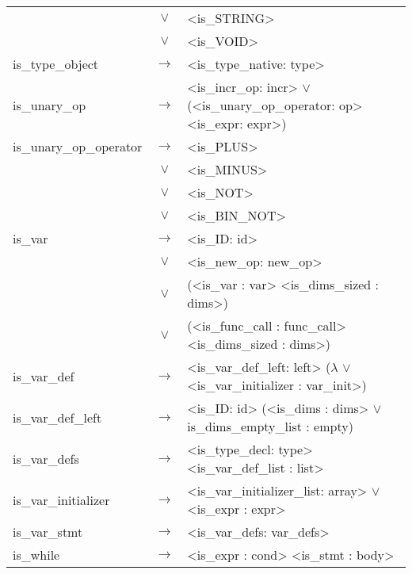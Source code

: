 \documentclass[a4paper]{article}
\begin{document}
\begin{longtable}{lcl}
								& $\vee$ & <is\_STRING> \\
								& $\vee$ & <is\_VOID> \\
	is\_type\_object			& $\to$ & <is\_type\_native: type> \\
	is\_unary\_op				& $\to$ & <is\_incr\_op: incr> $\vee$ (<is\_unary\_op\_operator: op> <is\_expr: expr>) \\
	is\_unary\_op\_operator		& $\to$ & <is\_PLUS> \\
								& $\vee$ & <is\_MINUS> \\
								& $\vee$ & <is\_NOT> \\
								& $\vee$ & <is\_BIN\_NOT> \\
	is\_var					 	& $\to$ & <is\_ID: id> \\
								& $\vee$ & <is\_new\_op: new\_op> \\
								& $\vee$ & (<is\_var : var> <is\_dims\_sized : dims>) \\
								& $\vee$ & (<is\_func\_call : func\_call> <is\_dims\_sized : dims>) \\
	is\_var\_def			 	& $\to$ & <is\_var\_def\_left: left> ($\lambda$ $\vee$ <is\_var\_initializer : var\_init>) \\
	is\_var\_def\_left		 	& $\to$ & <is\_ID: id> (<is\_dims : dims> $\vee$ is\_dims\_empty\_list : empty) \\
	is\_var\_defs		 		& $\to$ & <is\_type\_decl: type> <is\_var\_def\_list : list> \\
	is\_var\_initializer 		& $\to$ & <is\_var\_initializer\_list: array> $\vee$ <is\_expr : expr> \\
	is\_var\_stmt				& $\to$ & <is\_var\_defs: var\_defs> \\	
	is\_while 					& $\to$ & <is\_expr : cond> <is\_stmt : body> \\
\end{longtable}

\cleardoublepage
\end{document}
